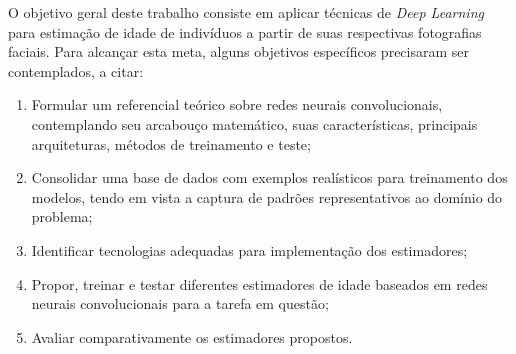 O objetivo geral deste trabalho consiste em aplicar técnicas de \emph{Deep Learning} para estimação de idade de indivíduos a partir de suas respectivas fotografias faciais. Para alcançar esta meta, alguns objetivos específicos precisaram ser contemplados, a citar:

\begin{enumerate}
     \item Formular um referencial teórico sobre redes neurais convolucionais, contemplando seu arcabouço matemático, suas características, principais arquiteturas, métodos de treinamento e teste;
     \item Consolidar uma base de dados com exemplos realísticos para treinamento dos modelos, tendo em vista a captura de padrões representativos ao domínio do problema;
     \item Identificar tecnologias adequadas para implementação dos estimadores;
     \item Propor, treinar e testar diferentes estimadores de idade baseados em redes neurais convolucionais para a tarefa em questão;
     \item Avaliar comparativamente os estimadores propostos.
\end{enumerate}
